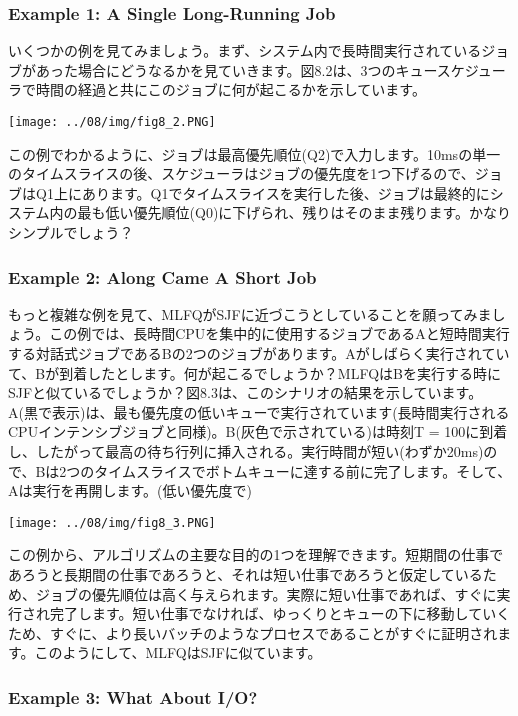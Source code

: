 \hypertarget{example-1-a-single-long-running-job}{%
\subsubsection*{Example 1: A Single Long-Running
Job}\label{example-1-a-single-long-running-job}}

いくつかの例を見てみましょう。まず、システム内で長時間実行されているジョブがあった場合にどうなるかを見ていきます。図8.2は、3つのキュースケジューラで時間の経過と共にこのジョブに何が起こるかを示しています。

\texttt{[image: ../08/img/fig8\_2.PNG]}

この例でわかるように、ジョブは最高優先順位(Q2)で入力します。10msの単一のタイムスライスの後、スケジューラはジョブの優先度を1つ下げるので、ジョブはQ1上にあります。Q1でタイムスライスを実行した後、ジョブは最終的にシステム内の最も低い優先順位(Q0)に下げられ、残りはそのまま残ります。かなりシンプルでしょう？

\hypertarget{example-2-along-came-a-short-job}{%
\subsubsection*{Example 2: Along Came A Short
Job}\label{example-2-along-came-a-short-job}}

もっと複雑な例を見て、MLFQがSJFに近づこうとしていることを願ってみましょう。この例では、長時間CPUを集中的に使用するジョブであるAと短時間実行する対話式ジョブであるBの2つのジョブがあります。Aがしばらく実行されていて、Bが到着したとします。何が起こるでしょうか？MLFQはBを実行する時にSJFと似ているでしょうか？図8.3は、このシナリオの結果を示しています。A(黒で表示)は、最も優先度の低いキューで実行されています(長時間実行されるCPUインテンシブジョブと同様)。B(灰色で示されている)は時刻T
=
100に到着し、したがって最高の待ち行列に挿入される。実行時間が短い(わずか20ms)ので、Bは2つのタイムスライスでボトムキューに達する前に完了します。そして、Aは実行を再開します。(低い優先度で)

\texttt{[image: ../08/img/fig8\_3.PNG]}

この例から、アルゴリズムの主要な目的の1つを理解できます。短期間の仕事であろうと長期間の仕事であろうと、それは短い仕事であろうと仮定しているため、ジョブの優先順位は高く与えられます。実際に短い仕事であれば、すぐに実行され完了します。短い仕事でなければ、ゆっくりとキューの下に移動していくため、すぐに、より長いバッチのようなプロセスであることがすぐに証明されます。このようにして、MLFQはSJFに似ています。

\hypertarget{example-3-what-about-io}{%
\subsubsection*{Example 3: What About
I/O?}\label{example-3-what-about-io}}

